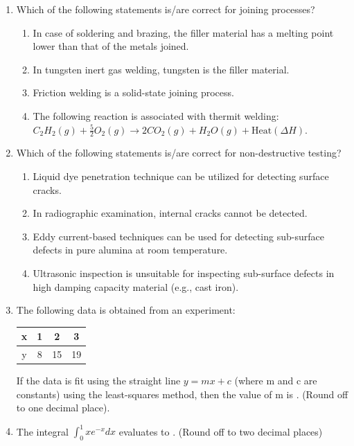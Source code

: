 \documentclass[journal]{IEEEtran}
\theoremstyle{remark}
\begin{document}
\begin{enumerate}[resume]
\item Which of the following statements is/are correct for joining processes?  \hfill{}
\begin{enumerate}
\item In case of soldering and brazing, the filler material has a melting point lower than that of the metals joined.
\item In tungsten inert gas welding, tungsten is the filler material.
\item Friction welding is a solid-state joining process.
\item The following reaction is associated with thermit welding:\\
$ C_2H_2(g) + \frac{5}{2} O_2(g)\rightarrow 2CO_2(g) + H_2O(g) + \text{Heat} (\Delta H)$.
\end{enumerate}

\item Which of the following statements is/are correct for non-destructive testing?   \hfill{}
\begin{enumerate}
\item Liquid dye penetration technique can be utilized for detecting surface cracks.
\item In radiographic examination, internal cracks cannot be detected.
\item Eddy current-based techniques can be used for detecting sub-surface defects in pure alumina at room temperature.
\item Ultrasonic inspection is unsuitable for inspecting sub-surface defects in high damping capacity material (e.g., cast iron).
\end{enumerate}

\item The following data is obtained from an experiment:
\begin{center}
\begin{tabular}{|c|c|c|c|}
\hline
x & 1 & 2 & 3 \\ \hline
y & 8 & 15 & 19\\
\hline
\end{tabular}
\end{center}
If the data is fit using the straight line $y=mx+c$ (where m and c are constants) using the least-squares method, then the value of m is \underline{\hspace{2cm}}. (Round off to one decimal place). \hfill{}

\item The integral $\int_0^1 x e^{-x} dx$ evaluates to \underline{\hspace{2cm}}. (Round off to two decimal places) \hfill{}


\end{enumerate}
\end{document}
